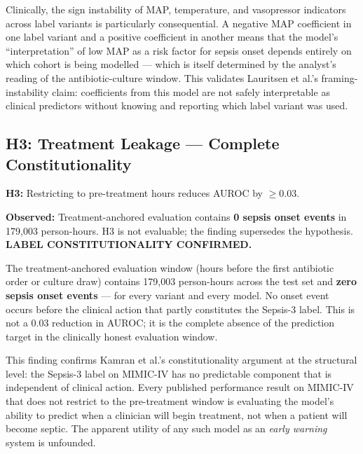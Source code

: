 Clinically, the sign instability of MAP, temperature, and vasopressor indicators
across label variants is particularly consequential. A negative MAP coefficient
in one label variant and a positive coefficient in another means that the model's
``interpretation'' of low MAP as a risk factor for sepsis onset depends entirely
on which cohort is being modelled --- which is itself determined by the analyst's
reading of the antibiotic-culture window. This validates Lauritsen et al.'s
\parencite{lauritsen2021framing} framing-instability claim: coefficients from
this model are not safely interpretable as clinical predictors without knowing
and reporting which label variant was used.

\subsection{H3: Treatment Leakage --- Complete Constitutionality}

\begin{mdframed}[backgroundcolor=ATUPurple!10, linecolor=ATUPurple]
  \textbf{H3:} Restricting to pre-treatment hours reduces AUROC by $\geq 0.03$.

  \textbf{Observed:} Treatment-anchored evaluation contains \textbf{0 sepsis
  onset events} in 179{,}003 person-hours.
  H3 is not evaluable; the finding supersedes the hypothesis.
  \textbf{LABEL CONSTITUTIONALITY CONFIRMED.}
\end{mdframed}

The treatment-anchored evaluation window (hours before the first antibiotic order
or culture draw) contains 179{,}003 person-hours across the test set and
\textbf{zero sepsis onset events} --- for every variant and every model.
No onset event occurs before the clinical action that partly constitutes the
Sepsis-3 label. This is not a 0.03 reduction in AUROC; it is the complete
absence of the prediction target in the clinically honest evaluation window.

This finding confirms Kamran et al.'s \parencite{kamran2024evaluation}
constitutionality argument at the structural level: the Sepsis-3 label on
MIMIC-IV has no predictable component that is independent of clinical action.
Every published performance result on MIMIC-IV that does not restrict to the
pre-treatment window is evaluating the model's ability to predict when a clinician
will begin treatment, not when a patient will become septic. The apparent utility
of any such model as an \textit{early warning} system is unfounded.

